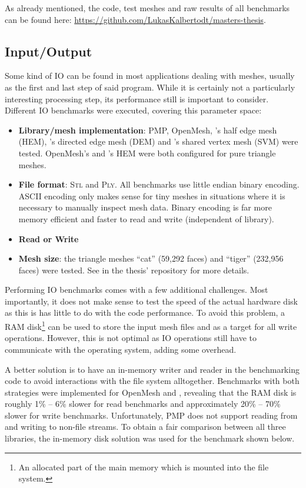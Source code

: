 As already mentioned, the code, test meshes and raw results of all benchmarks can be found here: \url{https://github.com/LukasKalbertodt/masters-thesis}.


\newpage
\subsection{Input/Output}

Some kind of IO can be found in most applications dealing with meshes, usually as the first and last step of said program.
While it is certainly not a particularly interesting processing step, its performance still is important to consider.
Different IO benchmarks were executed, covering this parameter space:

\begin{itemize}
  \item \textbf{Library/mesh implementation}: PMP, OpenMesh, 's half edge mesh (HEM), 's directed edge mesh (DEM) and 's shared vertex mesh (SVM) were tested.
  OpenMesh's and 's HEM were both configured for pure triangle meshes.
  \item \textbf{File format}: \textsc{Stl} and \textsc{Ply}.
  All benchmarks use little endian binary encoding.
  ASCII encoding only makes sense for tiny meshes in situations where it is necessary to manually inspect mesh data.
  Binary encoding is far more memory efficient and faster to read and write (independent of library).
  \item \textbf{Read or Write}
  \item \textbf{Mesh size}: the triangle meshes \enquote{cat} (59,292 faces) and \enquote{tiger} (232,956 faces) were tested.
  See  in the thesis' repository for more details.
\end{itemize}

Performing IO benchmarks comes with a few additional challenges.
Most importantly, it does not make sense to test the speed of the actual hardware disk as this is has little to do with the code performance.
To avoid this problem, a RAM disk\footnote{An allocated part of the main memory which is mounted into the file system.} can be used to store the input mesh files and as a target for all write operations.
However, this is not optimal as IO operations still have to communicate with the operating system, adding some overhead.

A better solution is to have an in-memory writer and reader in the benchmarking code to avoid interactions with the file system alltogether.
Benchmarks with both strategies were implemented for OpenMesh and , revealing that the RAM disk is roughly 1\% -- 6\% slower for read benchmarks and approximately 20\% -- 70\% slower for write benchmarks.
Unfortunately, PMP does not support reading from and writing to non-file streams.
To obtain a fair comparison between all three libraries, the in-memory disk solution was used for the benchmark shown below.

